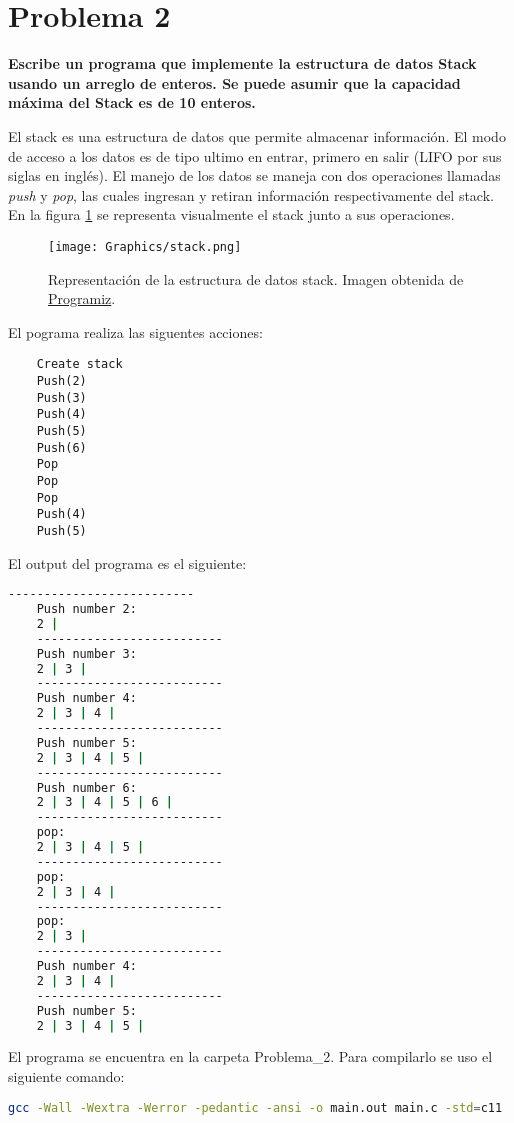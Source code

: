 \section*{Problema 2}
\textbf{Escribe un programa que implemente la estructura de datos Stack usando un arreglo de enteros. Se puede asumir que la capacidad máxima del Stack es de 10 enteros.}

El stack es una estructura de datos que permite almacenar información. El modo de acceso a los datos es de tipo ultimo en entrar, primero en salir (LIFO por sus siglas en inglés). El manejo de los datos se maneja con dos operaciones llamadas \textit{push} y \textit{pop}, las cuales ingresan y retiran información respectivamente del stack. En la figura \ref{fig:stack} se representa visualmente el stack junto a sus operaciones.

\begin{figure}[H]
    \centering
    \texttt{[image: Graphics/stack.png]}
    \caption{Representación de la estructura de datos stack. Imagen obtenida de \href{https://cdn.programiz.com/sites/tutorial2program/files/stack.png}{Programiz}.}
    \label{fig:stack}
\end{figure}

El pograma realiza las siguentes acciones:

\begin{lstlisting}
    Create stack
    Push(2)
    Push(3)
    Push(4)
    Push(5)
    Push(6)
    Pop
    Pop
    Pop
    Push(4)
    Push(5)
\end{lstlisting}

El output del programa es el siguiente:
\begin{lstlisting}[language=bash]
    --------------------------
    Push number 2:
    2 |
    --------------------------
    Push number 3:
    2 | 3 |
    --------------------------
    Push number 4:
    2 | 3 | 4 |
    --------------------------
    Push number 5:
    2 | 3 | 4 | 5 |
    --------------------------
    Push number 6:
    2 | 3 | 4 | 5 | 6 |
    --------------------------
    pop:
    2 | 3 | 4 | 5 |
    --------------------------
    pop:
    2 | 3 | 4 |
    --------------------------
    pop:
    2 | 3 |
    --------------------------
    Push number 4:
    2 | 3 | 4 |
    --------------------------
    Push number 5:
    2 | 3 | 4 | 5 |
\end{lstlisting}

El programa se encuentra en la carpeta \textcolor{citecolor}{Problema\_2}. Para compilarlo se uso el siguiente comando:

\begin{lstlisting}[language=bash]
    gcc -Wall -Wextra -Werror -pedantic -ansi -o main.out main.c -std=c11
\end{lstlisting}